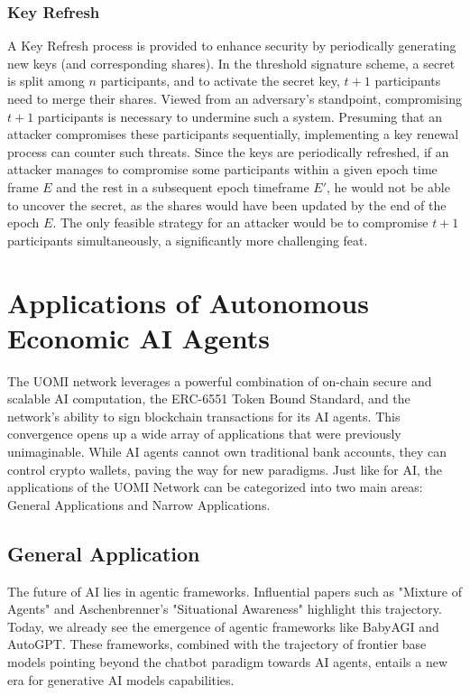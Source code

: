 \documentclass{article}
\begin{document}
\subsubsection{Key Refresh}
A Key Refresh process is provided to enhance security by periodically generating new keys (and corresponding shares). In the threshold signature scheme, a secret is split among \(n\) participants, and to activate the secret key,  \(t+1\) participants need to merge their shares. 
Viewed from an adversary's standpoint, compromising \(t+1\) participants is necessary to undermine such a system. Presuming that an attacker compromises these participants sequentially, implementing a key renewal process can counter such threats. 
Since the keys are periodically refreshed, if an attacker manages to compromise some participants within a given epoch time frame \(E\) and the rest in a subsequent epoch timeframe \(E'\), he would not be able to uncover the secret, as the shares would have been updated by the end of the epoch \(E\). The only feasible strategy for an attacker would be to compromise \(t+1\) participants simultaneously, a significantly more challenging feat.


\section{Applications of Autonomous Economic AI Agents}


The UOMI network leverages a powerful combination of on-chain secure and scalable AI computation, the ERC-6551 Token Bound Standard, and the network's ability to sign blockchain transactions for its AI agents. This convergence opens up a wide array of applications that were previously unimaginable. While AI agents cannot own traditional bank accounts, they can control crypto wallets, paving the way for new paradigms.
Just like for AI, the applications of the UOMI Network can be categorized into two main areas: General Applications and Narrow Applications.

\subsection{General Application}

The future of AI lies in agentic frameworks. Influential papers such as "Mixture of Agents" and Aschenbrenner’s "Situational Awareness" highlight this trajectory. Today, we already see the emergence of agentic frameworks like BabyAGI and AutoGPT. These frameworks, combined with the  trajectory of frontier base models pointing beyond the chatbot paradigm towards AI agents, entails a new era for generative AI models capabilities.
\end{document}
